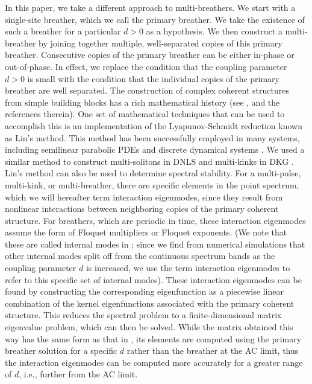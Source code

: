\documentclass[12pt,reqno]{amsart}
\theoremstyle{definition}
\begin{document}
In this paper, we take a different approach to multi-breathers. We start with a single-site breather, which we call the primary breather. We take the existence of such a breather for a particular $d>0$ as a hypothesis. We then construct a multi-breather by joining together multiple, well-separated copies of this primary breather. Consecutive copies of the primary breather can be either in-phase or out-of-phase. In effect, we replace the condition that the coupling parameter $d>0$ is small with the condition that the individual copies of the primary breather are well separated. 
The construction of complex coherent structures from simple building blocks has a rich mathematical history (see \cite{Sandstede1998}, and the references therein). One set of mathematical techniques that can be used to accomplish this is an implementation of the Lyapunov-Schmidt reduction known as Lin's method. This method has been successfully employed in many systems, including semilinear parabolic PDEs \cites{Sandstede1998,doi:10.1137/0150029} and discrete dynamical systems \cite{Knobloch2000}. We used a similar method to construct multi-solitons in DNLS \cite{Parker2020} and multi-kinks in DKG \cite{Parker2021}. Lin's method can also be used to determine spectral stability. For a multi-pulse, multi-kink, or multi-breather, there are specific elements in the point spectrum, which we will 
hereafter term interaction eigenmodes, since they result from nonlinear interactions between neighboring copies of the primary coherent structure. For breathers, which are periodic in time, these interaction eigenmodes assume the form of Floquet multipliers or Floquet exponents.
(We note that these are called internal modes in \cite{cuevas-maraver2016}; since we find from numerical simulations that other internal modes split off from the continuous spectrum bands as the coupling parameter $d$ is increased, we use the term interaction eigenmodes to refer to this specific set of internal modes).
These interaction eigenmodes can be found by constructing the corresponding eigenfunction as a piecewise linear combination of the kernel eigenfunctions associated with the primary coherent structure. This reduces the spectral problem to a finite-dimensional matrix eigenvalue problem, which can then be solved. While the matrix obtained this way has the same form as that in \cites{Pelinovsky2012,cuevas-maraver2016}, its elements are computed using the primary breather solution for a specific $d$ rather than the breather at the AC limit, thus the interaction eigenmodes can be computed more accurately for a greater range of $d$, i.e., further from the AC limit.
\end{document}
